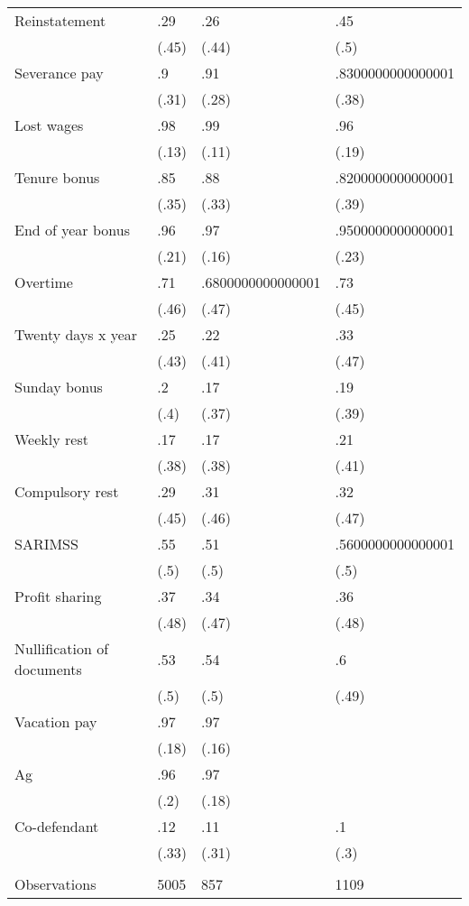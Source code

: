 \begin{tabular}{llll}
\cmidrule{2-4}Reinstatement & .29   & .26   & .45 \\
      & (.45) & (.44) & (.5) \\
Severance pay & .9    & .91   & .8300000000000001 \\
      & (.31) & (.28) & (.38) \\
Lost wages & .98   & .99   & .96 \\
      & (.13) & (.11) & (.19) \\
Tenure bonus & .85   & .88   & .8200000000000001 \\
      & (.35) & (.33) & (.39) \\
End of year bonus & .96   & .97   & .9500000000000001 \\
      & (.21) & (.16) & (.23) \\
Overtime & .71   & .6800000000000001 & .73 \\
      & (.46) & (.47) & (.45) \\
Twenty days x year & .25   & .22   & .33 \\
      & (.43) & (.41) & (.47) \\
Sunday bonus & .2    & .17   & .19 \\
      & (.4)  & (.37) & (.39) \\
Weekly rest & .17   & .17   & .21 \\
      & (.38) & (.38) & (.41) \\
Compulsory rest & .29   & .31   & .32 \\
      & (.45) & (.46) & (.47) \\
SARIMSS & .55   & .51   & .5600000000000001 \\
      & (.5)  & (.5)  & (.5) \\
Profit sharing & .37   & .34   & .36 \\
      & (.48) & (.47) & (.48) \\
Nullification of documents & .53   & .54   & .6 \\
      & (.5)  & (.5)  & (.49) \\
Vacation pay & .97   & .97   &  \\
      & (.18) & (.16) &  \\
Ag    & .96   & .97   &  \\
      & (.2)  & (.18) &  \\
Co-defendant & .12   & .11   & .1 \\
      & (.33) & (.31) & (.3) \\
\midrule
\midrule
      &       &       &  \\
Observations & 5005  & 857   & 1109 \\
\bottomrule
\end{tabular}%
